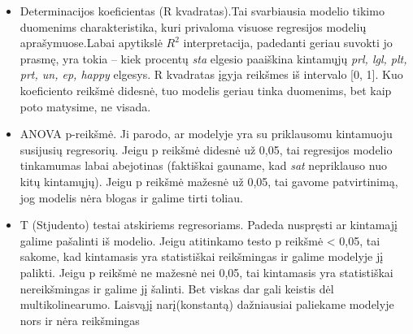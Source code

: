 \documentclass[12pt,a4paper]{article}
\theoremstyle{change}\newtheorem{salyga}{Uždavinys}
\begin{document}
\begin{itemize}
\item Determinacijos koeficientas (R kvadratas).Tai svarbiausia modelio tikimo duomenims charakteristika, kuri privaloma visuose regresijos modelių aprašymuose.Labai apytikslė $ R^{2}$ interpretacija, padedanti geriau suvokti jo prasmę, yra tokia – kiek procentų \textit{sta} elgesio paaiškina kintamųjų \textit{prl, lgl, plt, prt, un, ep, happy} elgesys. R kvadratas įgyja reikšmes iš intervalo [0, 1]. Kuo koeficiento reikšmė didesnė, tuo modelis geriau tinka duomenims, bet kaip poto matysime, ne visada.
\newline
\item ANOVA p-reikšmė. Ji parodo, ar modelyje yra su priklausomu kintamuoju susijusių regresorių. Jeigu p reikšmė didesnė už 0,05, tai regresijos modelio tinkamumas labai abejotinas (faktiškai gauname, kad \textit{sat} nepriklauso nuo kitų kintamųjų). Jeigu p reikšmė mažesnė už 0,05, tai gavome patvirtinimą, jog modelis nėra blogas ir galime tirti toliau.
\newline
\item T (Stjudento) testai atskiriems regresoriams. Padeda nuspręsti ar kintamajį galime pašalinti iš modelio. Jeigu atitinkamo testo p reikšmė < 0,05, tai sakome, kad kintamasis yra statistiškai reikšmingas ir galime modelyje jį palikti. Jeigu p reikšmė ne mažesnė nei 0,05, tai kintamasis yra statistiškai nereikšmingas ir galime jį šalinti. Bet viskas dar gali keistis dėl multikolinearumo. Laisvąjį narį(konstantą) dažniausiai paliekame modelyje nors ir nėra reikšmingas
\end{itemize}
\end{document}
